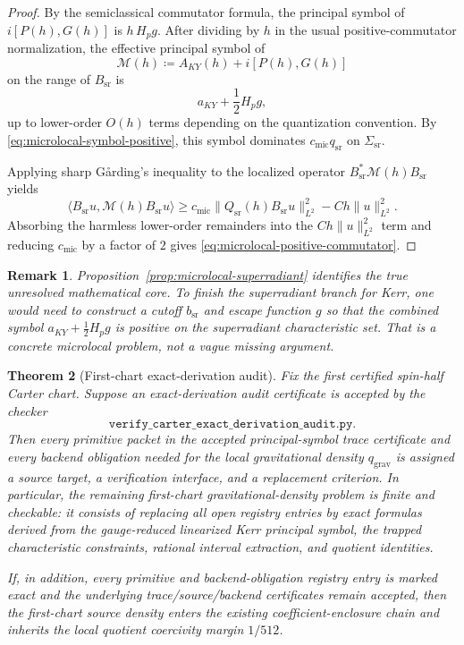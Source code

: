 \documentclass[12pt,a4paper]{article}
\newtheorem{theorem}{Theorem}[section]
\newtheorem{remark}[theorem]{Remark}
\begin{document}
\begin{proof}
By the semiclassical commutator formula, the principal symbol of $i[P(h),G(h)]$ is $h\,H_p g$. After dividing by $h$ in the usual positive-commutator normalization, the effective principal symbol of
\begin{equation}
\mathcal{M}(h) \coloneqq A_{KY}(h) + i[P(h),G(h)]
\end{equation}
on the range of $B_{\mathrm{sr}}$ is
\begin{equation}
a_{KY} + \frac12 H_p g,
\end{equation}
up to lower-order $O(h)$ terms depending on the quantization convention. By \eqref{eq:microlocal-symbol-positive}, this symbol dominates $c_{\mathrm{mic}} q_{\mathrm{sr}}$ on $\Sigma_{\mathrm{sr}}$.

Applying sharp G{\aa}rding's inequality to the localized operator $B_{\mathrm{sr}}^* \mathcal{M}(h) B_{\mathrm{sr}}$ yields
\begin{equation}
\langle B_{\mathrm{sr}}u, \mathcal{M}(h) B_{\mathrm{sr}}u\rangle
\ge c_{\mathrm{mic}}\|Q_{\mathrm{sr}}(h)B_{\mathrm{sr}}u\|_{L^2}^2 - C h \|u\|_{L^2}^2.
\end{equation}
Absorbing the harmless lower-order remainders into the $Ch\|u\|_{L^2}^2$ term and reducing $c_{\mathrm{mic}}$ by a factor of $2$ gives \eqref{eq:microlocal-positive-commutator}.
\end{proof}

\begin{remark}
Proposition~\ref{prop:microlocal-superradiant} identifies the true unresolved mathematical core. To finish the superradiant branch for Kerr, one would need to construct a cutoff $b_{\mathrm{sr}}$ and escape function $g$ so that the combined symbol $a_{KY} + \frac12 H_p g$ is positive on the superradiant characteristic set. That is a concrete microlocal problem, not a vague missing argument.
\end{remark}

\begin{theorem}[First-chart exact-derivation audit]\label{thm:first-chart-exact-derivation-audit}
Fix the first certified spin-half Carter chart. Suppose an exact-derivation audit certificate is accepted by the checker
\[
\texttt{verify\_carter\_exact\_derivation\_audit.py}.
\]
Then every primitive packet in the accepted principal-symbol trace certificate and every backend obligation needed for the local gravitational density $q_{\mathrm{grav}}$ is assigned a source target, a verification interface, and a replacement criterion. In particular, the remaining first-chart gravitational-density problem is finite and checkable: it consists of replacing all open registry entries by exact formulas derived from the gauge-reduced linearized Kerr principal symbol, the trapped characteristic constraints, rational interval extraction, and quotient identities.

If, in addition, every primitive and backend-obligation registry entry is marked exact and the underlying trace/source/backend certificates remain accepted, then the first-chart source density enters the existing coefficient-enclosure chain and inherits the local quotient coercivity margin $1/512$.
\end{theorem}
\end{document}
